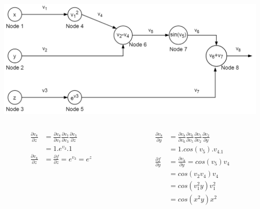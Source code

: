 \begin{frame}{}
	\includegraphics[width=.7\textwidth, center]{figuras/backprop_eg1.png}
	\begin{columns}[T]
		\begin{column}{.5\textwidth}
			\begin{align*}
					\frac{\partial v_8}{\partial z}&= 
					\frac{\partial v_8}{\partial v_7} 
					\frac{\partial v_7}{\partial v_3} 
					\frac{\partial v_3}{\partial z}  \\
					&= 1.e^{v_3}.1 \\
					\frac{\partial v_8}{\partial z}&=\frac{\partial f}{\partial z} 
					= e^{v_3}=e^z 
			\end{align*}
		\end{column}
		\begin{column}{.5\textwidth}
			\begin{align*}
			\frac{\partial v_8}{\partial y}&= 
			\frac{\partial v_8}{\partial v_6} 
			\frac{\partial v_6}{\partial v_5} 
			\frac{\partial v_5}{\partial v_2}  
			\frac{\partial v_2}{\partial y}\\
			& = 1.cos(v_5).v_4.1 \\
			\frac{\partial f}{\partial y}&=\frac{\partial v_8}{\partial y}
			= cos(v_5)v_4 \\
			&= cos(v_2v_4)v_4 \\
			&= cos(v^2_1y)v^2_1 \\
			&= cos(x^2y)x^2
			\end{align*}
		\end{column}
	\end{columns}
\end{frame}

